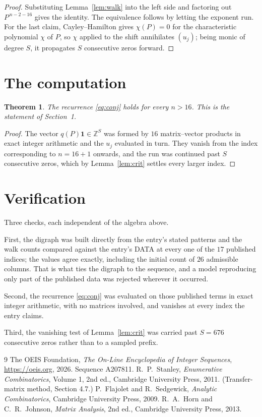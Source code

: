 \documentclass[11pt,a4paper]{article}
\theoremstyle{plain}
\newtheorem{theorem}{Theorem}
\theoremstyle{definition}
\begin{document}
\begin{proof}
Substituting Lemma~\ref{lem:walk} into the left side and factoring out
$P^{\,n-2-16}$ gives the identity. The equivalence follows by letting the exponent
run. For the last claim, Cayley--Hamilton gives $\chi(P)=0$ for the characteristic
polynomial $\chi$ of $P$, so $\chi$ applied to the shift annihilates $(u_j)$; being monic of
degree $S$, it propagates $S$ consecutive zeros forward.
\end{proof}

\section{The computation}

\begin{theorem}
The recurrence \eqref{eq:conj} holds for every $n>16$. This is the statement of
Section~1.
\end{theorem}

\begin{proof}
The vector $q(P)\mathbf{1}\in\mathbb{Z}^{S}$ was formed by $16$ matrix--vector
products in exact integer arithmetic and the $u_j$ evaluated in turn. They vanish from the
index corresponding to $n=16+1$ onwards, and the run was continued past $S$ consecutive
zeros, which by Lemma~\ref{lem:crit} settles every larger index.
\end{proof}

\section{Verification}

Three checks, each independent of the algebra above.

First, the digraph was built directly from the entry's stated patterns and the walk counts
compared against the entry's DATA at every one of the $17$ published indices; the
values agree exactly, including the initial count of $26$ admissible columns. That is
what ties the digraph to the sequence, and a model reproducing only part of the published
data was rejected wherever it occurred.

Second, the recurrence \eqref{eq:conj} was evaluated on those published terms in exact
integer arithmetic, with no matrices involved, and vanishes at every index the entry claims.

Third, the vanishing test of Lemma~\ref{lem:crit} was carried past $S=676$ consecutive
zeros rather than to a sampled prefix.

\begin{thebibliography}{9}
 The OEIS Foundation, \emph{The On-Line Encyclopedia of Integer
Sequences}, \url{https://oeis.org}, 2026. Sequence A207811.
 R.~P.~Stanley, \emph{Enumerative Combinatorics}, Volume 1, 2nd ed.,
Cambridge University Press, 2011. (Transfer-matrix method, Section 4.7.)
 P.~Flajolet and R.~Sedgewick, \emph{Analytic Combinatorics}, Cambridge
University Press, 2009.
 R.~A.~Horn and C.~R.~Johnson, \emph{Matrix Analysis}, 2nd ed., Cambridge
University Press, 2013.
\end{thebibliography}
\end{document}
